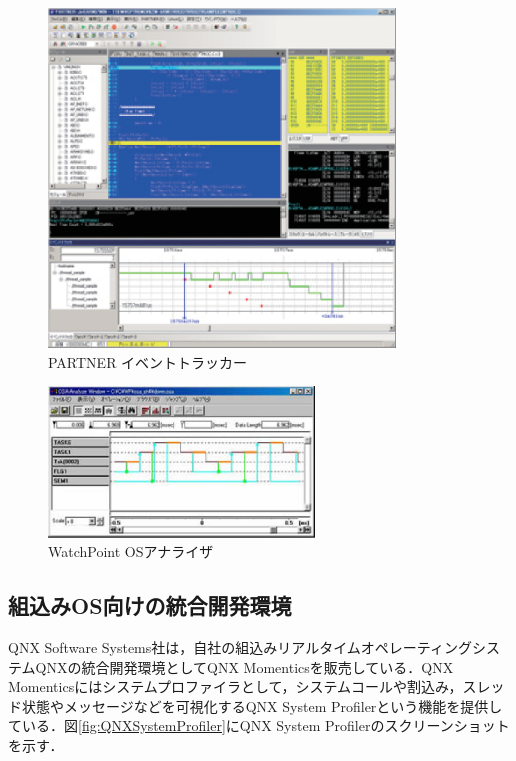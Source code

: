 \begin{figure}[p]
\begin{center}
\includegraphics[height=9cm]{img/PARTNER-JET.eps}
\caption{PARTNER イベントトラッカー}
\label{fig:PARTNER-JET}
\end{center}
\end{figure}

\begin{figure}[p]
\begin{center}
\includegraphics[height=4cm]{img/watchpoint.eps}
\caption{WatchPoint OSアナライザ}
\label{fig:watchpoint}
\end{center}
\end{figure}

\subsection{組込みOS向けの統合開発環境}

QNX Software Systems社は，自社の組込みリアルタイムオペレーティングシステムQNXの統合開発環境としてQNX Momenticsを販売している．QNX Momenticsにはシステムプロファイラとして，システムコールや割込み，スレッド状態やメッセージなどを可視化するQNX System Profiler\cite{QNXMomentics}という機能を提供している．図\ref{fig:QNXSystemProfiler}にQNX System Profilerのスクリーンショットを示す．

